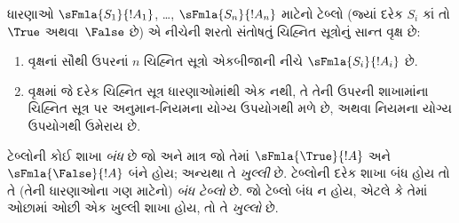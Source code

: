 \begin{defn}[ટેબ્લો]
ધારણાઓ $\sFmla{S_1}{!A_1}$, \dots, $\sFmla{S_n}{!A_n}$ માટેનો
ટેબ્લો (જ્યાં દરેક $S_i$ કાં તો $\True$ અથવા~$\False$ છે) એ
નીચેની શરતો સંતોષતું ચિહ્નિત સૂત્રોનું સાન્ત વૃક્ષ છે:
\begin{enumerate}
\item વૃક્ષનાં સૌથી ઉપરનાં $n$ ચિહ્નિત સૂત્રો એકબીજાની નીચે
  $\sFmla{S_i}{!A_i}$ છે.
\item વૃક્ષમાં જે દરેક ચિહ્નિત સૂત્ર ધારણાઓમાંથી એક નથી, તે તેની
  ઉપરની શાખામાંના ચિહ્નિત સૂત્ર પર અનુમાન-નિયમના યોગ્ય ઉપયોગથી
  મળે છે, અથવા \Cut{} નિયમના યોગ્ય ઉપયોગથી ઉમેરાય છે.
\end{enumerate}
ટેબ્લોની કોઈ શાખા \emph{બંધ} છે જો અને માત્ર જો તેમાં
$\sFmla{\True}{!A}$ અને~$\sFmla{\False}{!A}$ બંને હોય; અન્યથા તે
\emph{ખુલ્લી} છે. ટેબ્લોની દરેક શાખા બંધ હોય તો તે (તેની
ધારણાઓના ગણ માટેનો) \emph{બંધ ટેબ્લો} છે. જો ટેબ્લો બંધ ન
હોય, એટલે કે તેમાં ઓછામાં ઓછી એક ખુલ્લી શાખા હોય, તો તે \emph{ખુલ્લો}
છે.
\end{defn}

